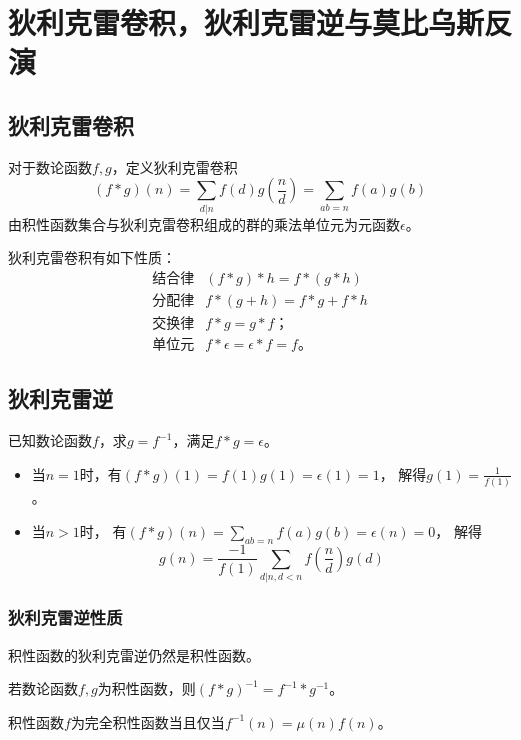\section{狄利克雷卷积，狄利克雷逆与莫比乌斯反演}
\subsection{狄利克雷卷积}
对于数论函数$f,g$，定义狄利克雷卷积
\begin{displaymath}
	(f*g)(n)=\sum_{d|n}{f(d)g(\frac{n}{d})}=\sum_{ab=n}{f(a)g(b)}
\end{displaymath}
由积性函数集合与狄利克雷卷积组成的群的乘法单位元为元函数$\epsilon$。

狄利克雷卷积有如下性质：
\begin{eqnarray*}
	\textrm{结合律} & (f*g)*h=f*(g*h)\\
	\textrm{分配律} & f*(g+h)=f*g+f*h\\
	\textrm{交换律} & f*g=g*f；\\
	\textrm{单位元} & f*\epsilon=\epsilon*f=f。
\end{eqnarray*}
\subsection{狄利克雷逆}
已知数论函数$f$，求$g=f^{-1}$，满足$f*g=\epsilon$。
\begin{itemize}
	\item 当$n=1$时，有$(f*g)(1)=f(1)g(1)=\epsilon(1)=1$，
	      解得$g(1)=\frac{1}{f(1)}$。
	\item 当$n>1$时，
	      有$\displaystyle (f*g)(n)=\sum_{ab=n}{f(a)g(b)}=\epsilon(n)=0$，
		解得
		\begin{displaymath}
		g(n)=\frac{-1}{f(1)}\sum_{d|n,d<n}{f(\frac{n}{d})g(d)}
		\end{displaymath}
\end{itemize}
\subsubsection{狄利克雷逆性质}
\begin{property}
	积性函数的狄利克雷逆仍然是积性函数。
\end{property}
\begin{property}
	若数论函数$f,g$为积性函数，则$(f*g)^{-1}=f^{-1}*g^{-1}$。
\end{property}
\begin{property}\label{CMFP}
	积性函数$f$为完全积性函数当且仅当$f^{-1}(n)=\mu(n)f(n)$。
\end{property}
